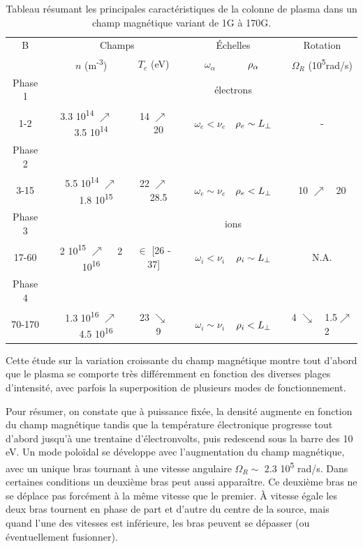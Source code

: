 \begin{refsection}
\begin{table}
\footnotesize\centering
{}
\begin{tabular}{@{}ccccccccc@{}}\toprule
B&&\multicolumn{2}{c}{Champs}&&\multicolumn{2}{c}{Échelles} &&
Rotation\\
\cmidrule{3-4} \cmidrule{6-7} \cmidrule{9-9}
&& $n$ (m\textsuperscript{-3}) & $T_e$ (eV)&& $\omega_\alpha$
&$\rho{_{\alpha}}$&& $\Omega_R$ (10\textsuperscript{5}rad/s)\\
\midrule Phase 1&&&&&\multicolumn{2}{c}{électrons}\\
\scriptsize 1-2 &&\scriptsize 3.3 10\textsuperscript{14} $\nearrow$~~
\scriptsize 3.5 10\textsuperscript{14} &\scriptsize14 $\nearrow$~~\scriptsize 20 &&
$\omega_e<\nu_e$ &\scriptsize$\rho{_{e}}\sim L_\perp$ && \scriptsize -
\\
Phase 2\\
\scriptsize 3-15 &&\scriptsize 5.5 10\textsuperscript{14}
$\nearrow$~~\scriptsize 1.8 10\textsuperscript{15} &\scriptsize22
$\nearrow$~~\scriptsize 28.5 && $\omega_e\sim\nu_e$ &\scriptsize$\rho{_{e}}<
L_\perp$ && \scriptsize 10 $\nearrow$~~\scriptsize20
\\
Phase 3 &&&&&\multicolumn{2}{c}{ions}\\
\scriptsize 17-60 &&\scriptsize 2 10\textsuperscript{15} $\nearrow$~~\scriptsize
2 10\textsuperscript{16} &\scriptsize$\in$ \scriptsize [26 - \scriptsize 37]
&& $\omega_i<\nu_i$ &\scriptsize$\rho{_{i}}\sim L_\perp$ && \scriptsize N.A.
\\
Phase 4 \\
\scriptsize 70-170 &&\scriptsize 1.3 10\textsuperscript{16}
$\nearrow$~~\scriptsize 4.5 10\textsuperscript{16} &\scriptsize23
$\searrow$~~\scriptsize 9 && $\omega_i\sim\nu_i$ &\scriptsize$\rho{_{i}}<
L_\perp$ && \scriptsize 4 $\searrow$~~\scriptsize1.5$\nearrow$~~\scriptsize2
\\
\bottomrule
\end{tabular}
\caption{Tableau résumant les principales
caractéristiques de la colonne de plasma dans un champ
magnétique variant de 1G à 170G.}\label{4-CybeleVarMagTab}
\end{table}

Cette étude sur la variation croissante du champ magnétique montre tout d'abord
que le plasma se comporte très différemment en fonction des diverses plages
d'intensité, avec parfois la superposition de plusieurs modes de fonctionnement.

Pour résumer, on constate que à puissance fixée, la densité augmente en
fonction du champ magnétique tandis que la température électronique progresse tout
d'abord jusqu'à une trentaine d'électronvolts, puis redescend sous la barre des
10 eV.
Un mode poloïdal se développe avec l'augmentation du champ magnétique, avec un
unique bras tournant à une vitesse angulaire $\Omega_R\sim$ 2.3 10\textsuperscript{5} rad/s. Dans
certaines conditions un deuxième bras peut aussi apparaître. Ce deuxième bras ne
se déplace pas forcément à la même vitesse que le premier. À vitesse égale
les deux bras tournent en phase de part et d'autre du centre de la source, mais
quand l'une des vitesses est inférieure, les bras peuvent se dépasser (ou
éventuellement fusionner).


\end{refsection}
